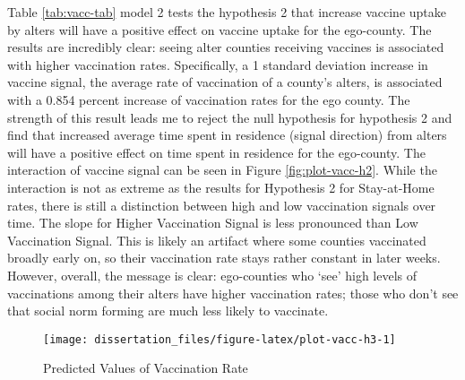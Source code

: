 Table \ref{tab:vacc-tab} model 2 tests the hypothesis 2 that increase vaccine
uptake by alters will have a positive effect on vaccine uptake for the
ego-county. The results are incredibly clear: seeing alter counties receiving
vaccines is associated with higher vaccination rates. Specifically, a 1 standard
deviation increase in vaccine signal, the average rate of vaccination of a
county's alters, is associated with a
0.854
percent increase of vaccination rates for the ego county. The strength of this
result leads me to reject the null hypothesis for hypothesis 2 and find that
increased average time spent in residence (signal direction) from alters will
have a positive effect on time spent in residence for the ego-county. The
interaction of vaccine signal can be seen in Figure \ref{fig:plot-vacc-h2}.
While the interaction is not as extreme as the results for Hypothesis 2 for
Stay-at-Home rates, there is still a distinction between high and low
vaccination signals over time. The slope for Higher Vaccination Signal is less
pronounced than Low Vaccination Signal. This is likely an artifact where some
counties vaccinated broadly early on, so their vaccination rate stays rather
constant in later weeks. However, overall, the message is clear: ego-counties
who `see' high levels of vaccinations among their alters have higher vaccination
rates; those who don't see that social norm forming are much less likely to
vaccinate.

\begin{figure}

{\centering \texttt{[image: dissertation\_files/figure-latex/plot-vacc-h3-1]} 

}

\caption{Predicted Values of Vaccination Rate}\label{fig:plot-vacc-h3}
\end{figure}

